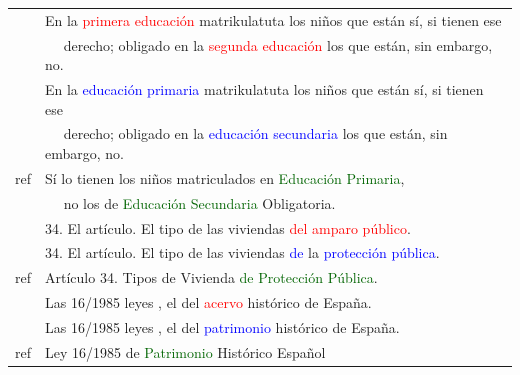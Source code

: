 \documentclass[25pt, a0paper, portrait, margin=0mm, innermargin=15mm,blockverticalspace=15mm, colspace=15mm, subcolspace=8mm]{tikzposter}
\begin{document}
\begin{columns}
{\begin{center}
\begin{tabular}{|l|l|}
& En la \textcolor{red}{primera educación} matrikulatuta los niños que están sí, si tienen ese  \\ 
& ~~ derecho; obligado en la \textcolor{red}{segunda educación} los que están, sin embargo, no.  \\  %
& En la \textcolor{blue}{educación primaria} matrikulatuta los niños que están sí, si tienen ese  \\ 
& ~~ derecho; obligado en la \textcolor{blue}{educación secundaria} los que están, sin embargo, no. \\  %
ref & Sí lo tienen los niños matriculados en \textcolor{darkgreen}{Educación Primaria}, \\
    &~~ no los de \textcolor{darkgreen}{Educación Secundaria} Obligatoria.\\
\hline

& 34. El artículo. El tipo de las viviendas \textcolor{red}{del amparo público}. \\ %
& 34. El artículo. El tipo de las viviendas \textcolor{blue}{de} la \textcolor{blue}{protección pública}. \\ %
ref & Artículo 34. Tipos de Vivienda \textcolor{darkgreen}{de Protección Pública}.\\
\hline
& Las 16/1985 leyes , el del \textcolor{red}{acervo} histórico de España. \\ %
& Las 16/1985 leyes , el del \textcolor{blue}{patrimonio} histórico de España.  \\ %
ref & Ley 16/1985 de \textcolor{darkgreen}{Patrimonio} Histórico Español \\
\hline
\end{tabular}
\end{center}



}


\end{columns}
\end{document}
